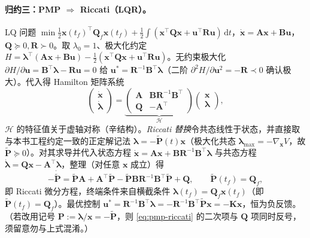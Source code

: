 \paragraph{归约三：PMP $\Rightarrow$ Riccati（LQR）。}
LQ 问题 $\min\tfrac12\mathbf x(t_f)^\top\mathbf Q_f\mathbf x(t_f)+\tfrac12\int(\mathbf x^\top\mathbf Q\mathbf x+\mathbf u^\top\mathbf R\mathbf u)\,\mathrm dt$，$\dot{\mathbf x}=\mathbf A\mathbf x+\mathbf B\mathbf u$，$\mathbf Q\succeq0,\mathbf R\succ0$。取 $\lambda_0=1$、极大化约定 $H=\boldsymbol\lambda^\top(\mathbf A\mathbf x+\mathbf B\mathbf u)-\tfrac12(\mathbf x^\top\mathbf Q\mathbf x+\mathbf u^\top\mathbf R\mathbf u)$。无约束极大化 $\partial H/\partial\mathbf u=\mathbf B^\top\boldsymbol\lambda-\mathbf R\mathbf u=0$ 给 $\mathbf u^\ast=\mathbf R^{-1}\mathbf B^\top\boldsymbol\lambda$（二阶 $\partial^2 H/\partial\mathbf u^2=-\mathbf R\prec0$ 确认极大）。代入得 Hamilton 矩阵系统
\begin{equation}
  \begin{pmatrix}\dot{\mathbf x}\\\dot{\boldsymbol\lambda}\end{pmatrix}=
  \underbrace{\begin{pmatrix}\mathbf A&\mathbf B\mathbf R^{-1}\mathbf B^\top\\ \mathbf Q&-\mathbf A^\top\end{pmatrix}}_{\mathcal H}
  \begin{pmatrix}\mathbf x\\\boldsymbol\lambda\end{pmatrix},
  \label{eq:pmp-hamilton-matrix}
\end{equation}
$\mathcal H$ 的特征值关于虚轴对称（辛结构）。\emph{Riccati 替换}令共态线性于状态，并直接取与本书工程约定一致的正定解记法 $\boldsymbol\lambda=-\tilde{\mathbf P}(t)\mathbf x$（极大化共态 $\boldsymbol\lambda_{\max}=-\nabla_{\mathbf x}V$，故 $\tilde{\mathbf P}\succeq0$）。对其求导并代入状态方程 $\dot{\mathbf x}=\mathbf A\mathbf x+\mathbf B\mathbf R^{-1}\mathbf B^\top\boldsymbol\lambda$ 与共态方程 $\dot{\boldsymbol\lambda}=\mathbf Q\mathbf x-\mathbf A^\top\boldsymbol\lambda$，整理（对任意 $\mathbf x$ 成立）得
\begin{equation}
  -\dot{\tilde{\mathbf P}}=\tilde{\mathbf P}\mathbf A+\mathbf A^\top\tilde{\mathbf P}-\tilde{\mathbf P}\mathbf B\mathbf R^{-1}\mathbf B^\top\tilde{\mathbf P}+\mathbf Q,\qquad \tilde{\mathbf P}(t_f)=\mathbf Q_f,
  \label{eq:pmp-riccati}
\end{equation}
即 Riccati 微分方程，终端条件来自横截条件 $\boldsymbol\lambda(t_f)=\mathbf Q_f\mathbf x(t_f)$（即 $\tilde{\mathbf P}(t_f)=\mathbf Q_f$）。最优控制 $\mathbf u^\ast=\mathbf R^{-1}\mathbf B^\top\boldsymbol\lambda=-\mathbf R^{-1}\mathbf B^\top\tilde{\mathbf P}\mathbf x=-\mathbf K\mathbf x$，恒为负反馈。（若改用记号 $\mathbf P:=\boldsymbol\lambda/\mathbf x=-\tilde{\mathbf P}$，则 \cref{eq:pmp-riccati} 的二次项与 $\mathbf Q$ 项同时反号，须留意勿与上式混淆。）

